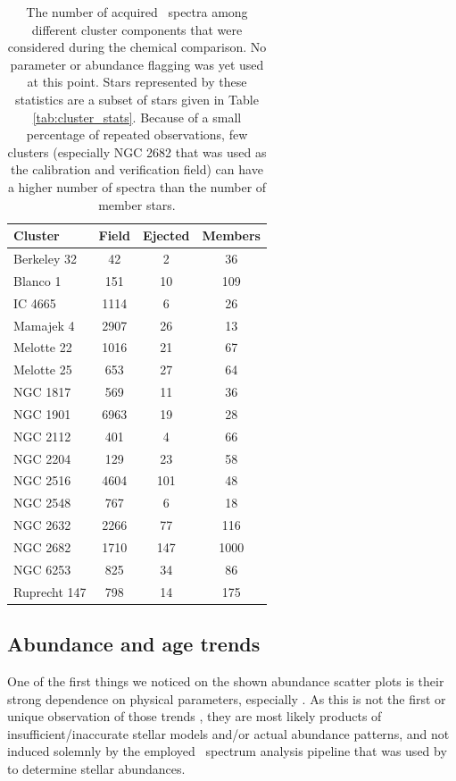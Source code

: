 \begin{table}
	\centering
	\caption{The number of acquired \Gh\ spectra among different cluster components that were considered during the chemical comparison. No parameter or abundance flagging was yet used at this point. Stars represented by these statistics are a subset of stars given in Table \ref{tab:cluster_stats}. Because of a small percentage of repeated observations, few clusters (especially NGC 2682 that was used as the calibration and verification field) can have a higher number of spectra than the number of member stars.}
	\begin{tabular}{l c c c }
		\hline
		Cluster & Field & Ejected & Members \\
		\hline \hline
		Berkeley 32  & 42 & 2 & 36 \\ 
		Blanco 1     & 151 & 10 & 109 \\
		IC 4665      & 1114 & 6 & 26 \\
		Mamajek 4    & 2907 & 26 & 13 \\
		Melotte 22   & 1016 & 21 & 67 \\
		Melotte 25   & 653 & 27 & 64 \\
		NGC 1817     & 569 & 11 & 36 \\
		NGC 1901     & 6963 & 19 & 28 \\
		NGC 2112     & 401 & 4 & 66 \\
		NGC 2204     & 129 & 23 & 58 \\
		NGC 2516     & 4604 & 101 & 48 \\
		NGC 2548     & 767 & 6 & 18 \\
		NGC 2632     & 2266 & 77 & 116 \\
		NGC 2682     & 1710 & 147 & 1000 \\
		NGC 6253     & 825 & 34 & 86 \\
		Ruprecht 147 & 798 & 14 & 175 \\
		\hline
	\end{tabular}
	\label{tab:cluster_stats_abund}
\end{table}

\subsection{Abundance and age trends}
\label{sec:abund_trends}
One of the first things we noticed on the shown abundance scatter plots is their strong dependence on physical parameters, especially \Teff. As this is not the first or unique observation of those trends \cite{2010A&A...523A..71G, 2013ApJ...775...58B, 2016MNRAS.457.3934L, 2018A&A...619A.176B, 2019arXiv191208539C}, they are most likely products of insufficient/inaccurate stellar models and/or actual abundance patterns, and not induced solemnly by the employed \SME\ spectrum analysis pipeline that was used by \citet{buder2020} to determine stellar abundances.

